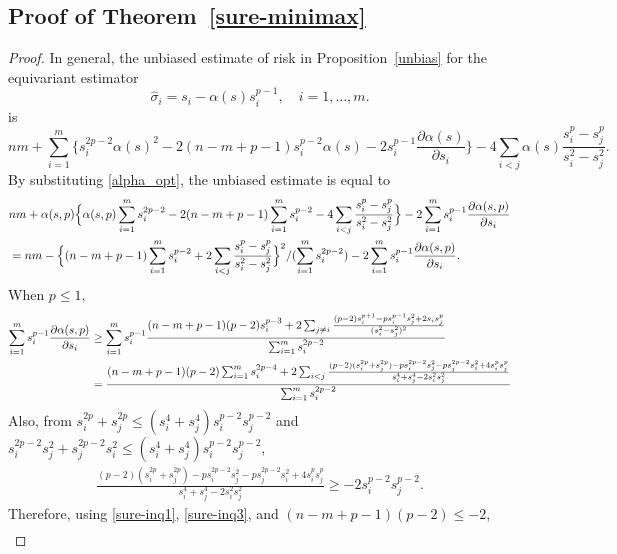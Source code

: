 \documentclass[11pt, a4paper]{article}
\theoremstyle{remark}
\begin{document}
\subsection{Proof of Theorem~\ref{sure-minimax}}

\begin{proof}
In general, the unbiased estimate of risk in Proposition~\ref{unbias} for the equivariant estimator
\[
\hat\sigma_i= s_i-\alpha( s) s_i^{p-1}, \quad i=1,\dots,m.
\]
is
\begin{equation*}
    nm+\sum_{i=1}^m\Big\{ s_i^{2p-2}\alpha( s)^2-2(n-m+p-1) s_i^{p-2}\alpha( s)-2 s_i^{p-1}\frac{\partial\alpha( s)}{\partial s_i} \Big\}-4\sum_{i<j}\alpha( s)\frac{ s_i^p- s_j^p}{ s_i^2- s_j^2}. 
\end{equation*}
   By substituting \eqref{alpha_opt}, the unbiased estimate is equal to
   \begin{align}
   &nm+\alpha( s,p)\Big\{\alpha( s,p)\sum_{i=1}^m s_i^{2p-2}-2(n-m+p-1)\sum_{i=1}^m s_i^{p-2}-4\sum_{i<j}\frac{ s_i^p- s_j^p}{ s_i^2- s_j^2}\Big\}-2\sum_{i=1}^m s_i^{p-1}\frac{\partial\alpha( s,p)}{\partial s_i} \notag\\
    &=nm-\Big\{(n-m+p-1)\sum_{i=1}^m s_i^{p-2}+2\sum_{i<j}\frac{ s_i^p- s_j^p}{ s_i^2- s_j^2}\Big\}^2/(\sum_{i=1}^m s_i^{2p-2})-2\sum_{i=1}^m s_i^{p-1}\frac{\partial\alpha( s,p)}{\partial s_i}. \label{sure-min}
\end{align} 
When $p\le1,$
\begin{align}
    \sum_{i=1}^m s_i^{p-1}\frac{\partial\alpha( s,p)}{\partial s_i}&\ge\sum_{i=1}^m s_i^{p-1}\frac{(n-m+p-1)(p-2) s_i^{p-3}+2\sum_{j\neq i}\frac{(p-2) s_i^{p+1}-p s_i^{p-1} s_j^2+2 s_i s_j^p}{( s_i^2- s_j^2)^2}}{\sum_{i=1}^m s_i^{2p-2}}\notag\\
    &=\frac{(n-m+p-1)(p-2)\sum_{i=1}^m s_i^{2p-4}+2\sum_{i<j}\frac{(p-2)( s_i^{2p}+ s_j^{2p})-p s_i^{2p-2} s_j^2-p s_j^{2p-2} s_i^2+4 s_i^p s_j^p}{ s_i^4+ s_j^4-2 s_i^2 s_j^2}}{\sum_{i=1}^m s_i^{2p-2}} \label{sure-inq1}
    \end{align}
Also, from $ s_i^{2p}+ s_j^{2p}\le( s_i^4+ s_j^4) s_i^{p-2} s_j^{p-2}$ and $ s_i^{2p-2} s_j^2+ s_j^{2p-2} s_i^2\le( s_i^4+ s_j^4) s_i^{p-2} s_j^{p-2}$, 
\begin{align}
    \frac{(p-2)( s_i^{2p}+ s_j^{2p})-p s_i^{2p-2} s_j^2-p s_j^{2p-2} s_i^2+4 s_i^p s_j^p}{ s_i^4+ s_j^4-2 s_i^2 s_j^2}\ge-2 s_i^{p-2} s_j^{p-2}.\label{sure-inq3}
\end{align}
Therefore, using \eqref{sure-inq1}, \eqref{sure-inq3}, and $(n-m+p-1)(p-2)\le-2$,
    \begin{align}

\end{align}
\end{proof}
\end{document}
